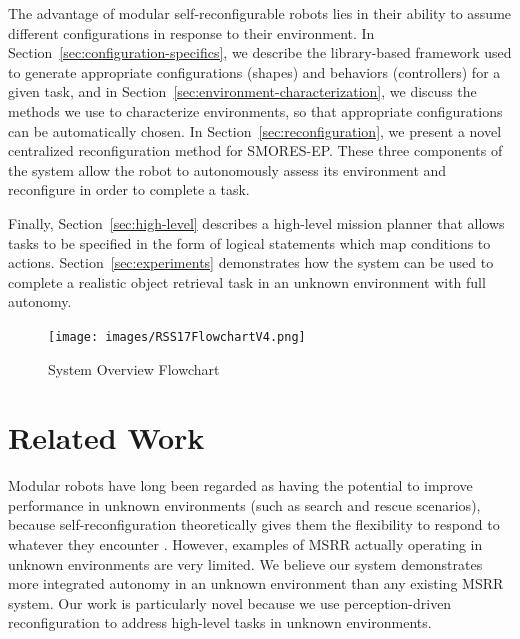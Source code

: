 \documentclass[conference]{IEEEtran}
\begin{document}
The advantage of modular self-reconfigurable robots lies in their ability to assume different configurations in response to their environment.  In Section~\ref{sec:configuration-specifics}, we describe the library-based framework used to generate appropriate configurations (shapes) and behaviors (controllers) for a given task, and in Section~\ref{sec:environment-characterization}, we discuss the methods we use to characterize environments, so that appropriate configurations can be automatically chosen.  In Section~\ref{sec:reconfiguration}, we present a novel centralized reconfiguration method for SMORES-EP.  These three components of the system allow the robot to autonomously assess its environment and reconfigure in order to complete a task.

Finally, Section~\ref{sec:high-level} describes a high-level mission planner that allows tasks to be specified in the form of logical statements which map conditions to actions.  Section~\ref{sec:experiments} demonstrates how the system can be used to complete a realistic object retrieval task in an unknown environment with full autonomy. 
%
\begin{figure}
\begin{center}
\texttt{[image: images/RSS17FlowchartV4.png]}
\caption{System Overview Flowchart}
\label{fig:overview}
\end{center}
\vspace{-1em}
\end{figure} 
%

\section{Related Work}\label{sec:related-work}
%
%
Modular robots have long been regarded as having the potential to improve performance in unknown environments (such as search and rescue scenarios), because  self-reconfiguration theoretically gives them the flexibility to respond to whatever they encounter \cite{Yim2007a,yim2003modular}.  However, examples of MSRR actually operating in unknown environments are very limited. We believe our system demonstrates more integrated autonomy in an unknown environment than any existing MSRR system.  Our work is particularly novel because we use perception-driven reconfiguration to address high-level tasks in unknown environments.
\end{document}
